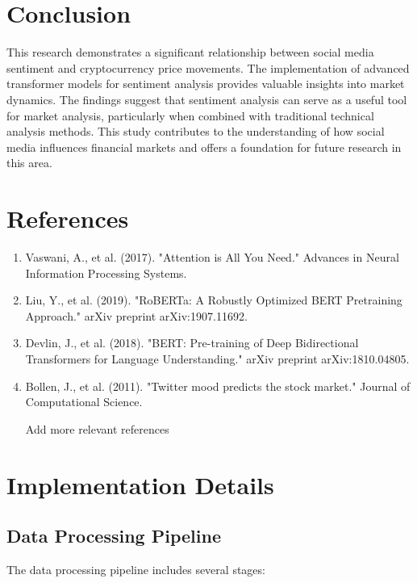 \documentclass[12pt,a4paper]{report}
\begin{document}
\chapter{Conclusion}
This research demonstrates a significant relationship between social media
sentiment and cryptocurrency price movements. The implementation of advanced
transformer models for sentiment analysis provides valuable insights into
market dynamics. The findings suggest that sentiment analysis can serve as a
useful tool for market analysis, particularly when combined with traditional
technical analysis methods. This study contributes to the understanding of how
social media influences financial markets and offers a foundation for future
research in this area.

\chapter{References}
\begin{enumerate}
    \item Vaswani, A., et al. (2017). "Attention is All You Need." Advances in Neural
          Information Processing Systems.
    \item Liu, Y., et al. (2019). "RoBERTa: A Robustly Optimized BERT Pretraining
          Approach." arXiv preprint arXiv:1907.11692.
    \item Devlin, J., et al. (2018). "BERT: Pre-training of Deep Bidirectional
          Transformers for Language Understanding." arXiv preprint arXiv:1810.04805.
    \item Bollen, J., et al. (2011). "Twitter mood predicts the stock market." Journal of
          Computational Science.
    \item [Add more relevant references]
\end{enumerate}

\appendix
\chapter{Implementation Details}
\section{Data Processing Pipeline}
The data processing pipeline includes several stages:
\end{document}
